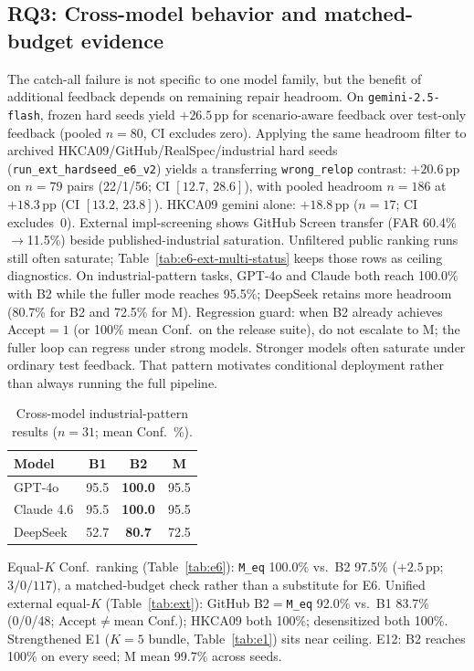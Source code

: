 \documentclass[10pt,conference]{IEEEtran}
\begin{document}
\subsection{RQ3: Cross-model behavior and matched-budget evidence}
The catch-all failure is not specific to one model family, but the benefit of
additional feedback depends on remaining repair headroom.
On \texttt{gemini-2.5-flash}, frozen hard seeds yield ${+}26.5$\,pp for
scenario-aware feedback over test-only feedback (pooled $n{=}80$, CI excludes
zero).
Applying the same headroom filter to archived HKCA09/GitHub/RealSpec/industrial
hard seeds (\texttt{run\_ext\_hardseed\_e6\_v2}) yields a transferring
\texttt{wrong\_relop} contrast: ${+}20.6$\,pp on $n{=}79$ pairs (22/1/56;
CI $[12.7,\,28.6]$), with pooled headroom $n{=}186$ at ${+}18.3$\,pp
(CI $[13.2,\,23.8]$).
HKCA09 gemini alone: ${+}18.8$\,pp ($n{=}17$; CI excludes~0).
External impl-screening shows GitHub Screen transfer
(FAR 60.4\%$\rightarrow$11.5\%) beside published-industrial saturation.
Unfiltered public ranking runs still often saturate; Table~\ref{tab:e6-ext-multi-status}
keeps those rows as ceiling diagnostics.
On industrial-pattern tasks, GPT-4o and Claude both reach 100.0\%
with B2 while the fuller mode reaches 95.5\%; DeepSeek retains more headroom
(80.7\% for B2 and 72.5\% for M).
Regression guard: when B2 already achieves Accept${=}1$ (or 100\% mean Conf.\ on
the release suite), do not escalate to M; the fuller loop can regress under
strong models.
Stronger models often saturate under ordinary test feedback. That pattern
motivates conditional deployment rather than always running the full pipeline.



\begin{table}[t]
\centering
\caption{Cross-model industrial-pattern results ($n{=}31$; mean Conf.\ \%).}
\label{tab:cross-model}
\footnotesize
\begin{tabular}{lccc}
\toprule
Model & B1 & B2 & M \\
\midrule
GPT-4o & 95.5 & \textbf{100.0} & 95.5 \\
Claude 4.6 & 95.5 & \textbf{100.0} & 95.5 \\
DeepSeek & 52.7 & \textbf{80.7} & 72.5 \\
\bottomrule
\end{tabular}
\end{table}

Equal-$K$ Conf.\ ranking (Table~\ref{tab:e6}): \texttt{M\_eq} 100.0\% vs.\ B2
97.5\% (${+}2.5$\,pp; $3/0/117$), a matched-budget check rather than a
substitute for E6.
Unified external equal-$K$ (Table~\ref{tab:ext}): GitHub B2${=}$\texttt{M\_eq}
92.0\% vs.\ B1 83.7\% (0/0/48; Accept$\neq$mean Conf.); HKCA09 both
100\%; desensitized both 100\%.
Strengthened E1 ($K{=}5$ bundle, Table~\ref{tab:e1}) sits near ceiling.
E12: B2 reaches 100\% on every seed; M mean 99.7\% across seeds.
\end{document}
